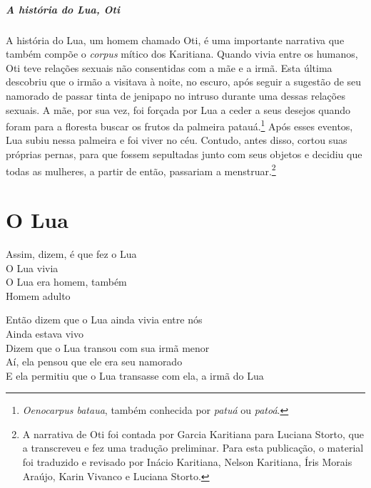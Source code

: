 \vspace*{\fill}
\paragraph{A história do Lua, Oti} A história do Lua, um homem chamado Oti, é uma importante narrativa que também compõe o \textit{corpus} mítico dos Karitiana. Quando vivia entre
os humanos, Oti teve relações sexuais não consentidas com a mãe e a
irmã. Esta última descobriu que o irmão a visitava à noite, no escuro,
após seguir a sugestão de seu namorado de passar tinta de jenipapo no
intruso durante uma dessas relações sexuais. A mãe, por sua vez, foi
forçada por Lua a ceder a seus desejos quando foram para a floresta
buscar os frutos da palmeira patauá.\footnote{\textit{Oenocarpus bataua}, também 
conhecida por \textit{patuá} ou \textit{patoá}.} Após esses eventos, Lua subiu
nessa palmeira e foi viver no céu. Contudo, antes disso, cortou suas
próprias pernas, para que fossem sepultadas junto com seus objetos e
decidiu que todas as mulheres, a partir de então, passariam a menstruar.\footnote{A narrativa de Oti foi contada por Garcia Karitiana para Luciana Storto,
que a transcreveu e fez uma tradução preliminar. Para esta publicação, o
material foi traduzido e revisado por Inácio Karitiana, Nelson
Karitiana, Íris Morais Araújo, Karin Vivanco e Luciana Storto.}
\vspace*{\fill}


\chapter{O Lua}

\noindent Assim, dizem, é que fez o Lua\\
O Lua vivia\\
O Lua era homem, também\\
Homem adulto

\smallskip
\begin{center}\end{center}
\smallskip

\noindent Então dizem que o Lua ainda vivia entre nós\\
Ainda estava vivo\\
Dizem que o Lua transou com sua irmã menor\\
Aí, ela pensou que ele era seu namorado\\
E ela permitiu que o Lua transasse com ela, a irmã do Lua

